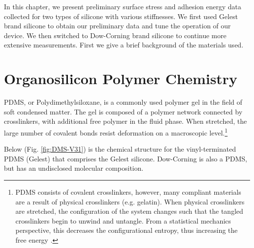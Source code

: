 In this chapter, we present preliminary surface stress and adhesion energy data collected for two types of silicone with various stiffnesses. We first used Gelest brand silicone to obtain our preliminary data and tune the operation of our device. We then switched to Dow-Corning brand silicone to continue more extensive measurements. First we give a brief background of the materials used. 


\section{Organosilicon Polymer Chemistry}
\label{section:polychem}
PDMS, or Polydimethylsiloxane, is a commonly used polymer gel in the field of soft condensed matter. The gel is composed of a polymer network connected by crosslinkers, with additional free polymer in the fluid phase. When stretched, the large number of covalent bonds resist deformation on a macroscopic level.\footnote{PDMS consists of covalent crosslinkers, however, many compliant materials are a result of physical crosslinkers (e.g. gelatin). When physical crosslinkers are stretched, the configuration of the system changes such that the tangled crosslinkers begin to unwind and untangle. From a statistical mechanics perspective, this decreases the configurational entropy, thus increasing the free energy \cite{Andreotti2020}.} 


Below (Fig. \ref{fig:DMS-V31}) is the chemical structure for the vinyl-terminated PDMS (Gelest) that comprises the Gelest silicone. Dow-Corning is also a PDMS, but has an undisclosed molecular composition.
\setatomsep{20pt}

\newcommand\setpolymerdelim[2]{\def\delimleft{#1}\def\delimright{#2}}
\def\makebraces(#1,#2)#3#4#5{%
	\edef\delimhalfdim{\the\dimexpr(#1+#2)/2}%
	\edef\delimvshift{\the\dimexpr(#1-#2)/2}%
	\chemmove{
		\node[at=(#4),yshift=(\delimvshift)]
		{$
			\left\delimleft
			\vrule height\delimhalfdim depth\delimhalfdim width0pt
			\right.
			$};
		\node[at=(#5),yshift=(\delimvshift)]
		{$
			\left.
			\vrule height\delimhalfdim depth\delimhalfdim width0pt
			\right\delimright_{\rlap{#3}}
			$};
	}%
}


